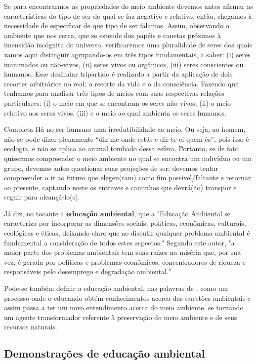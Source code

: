 Se para encontrarmos as propriedades do meio ambiente devemos antes afirmar as características
do tipo de ser do qual se faz negativo e relativo, então, chegamos à necessidade
de especificar de que tipo de ser falamos. Assim, observando o ambiente que nos cerca, que se
estende dos papéis e canetas próximos à imensidão incógnita do universo, verificaremos uma
pluralidade de seres dos quais vamos aqui distinguir agrupando-os em três tipos fundamentais,
a saber: (i) seres inanimados ou não-vivos, (ii) seres vivos ou orgânicos, (iii) seres conscientes
ou humanos. Esse deslindar tripartido é realizado a partir da aplicação de dois recortes arbitrários
no real: o recorte da vida e o da consciência. Fazendo que tenhamos para analisar três tipos
de meios com suas respectivas relações particulares: (i) o meio em que se encontram os seres
não-vivos, (ii) o meio relativo aos seres vivos, (iii) e o meio ao qual ambienta os seres humanos.

Completa  Há no ser humano uma irredutibilidade ao meio. Ou seja, ao homem, não se pode dizer
plenamente “diz-me onde estás e dir-te-ei quem és”, pois isso é ecologia, e não se aplica ao
animal tombado dessa esfera. Portanto, se de fato quisermos compreender o meio ambiente
no qual se encontra um indivíduo ou um grupo, devemos antes questionar suas projeções de
ser; devemos tentar compreender o ir ao futuro que elegeu(ram) como fim possível/faltante e
retornar ao presente, captando neste os entraves e caminhos que devrá(ão) transpor e seguir
para alcançá-lo(s).

Já   diz, no tocante a \textbf{educação ambiental}, que a "Educação Ambiental se caracteriza por
incorporar as dimensões sociais, políticas, econômicas,
culturais, ecológicas e éticas, deixando claro que ao discutir
qualquer problema ambiental é fundamental a consideração
de todos estes aspectos." Segundo este autor, "a maior parte
dos problemas ambientais tem suas raízes na miséria que,
por sua vez, é gerada por políticas e problemas econômicos,
concentradores de riqueza e responsáveis pelo desemprego
e degradação ambiental."

Pode-se também definir a educação ambiental, nas palavras de , como um processo
onde o educando obtém conhecimentos acerca das
questões ambientais e assim passa a ter um novo
entendimento acerca do meio ambiente, se tornando um
agente transformador referente à preservação do meio
ambiente e de seus recursos naturais.

\subsection{Demonstrações de educação ambiental}

